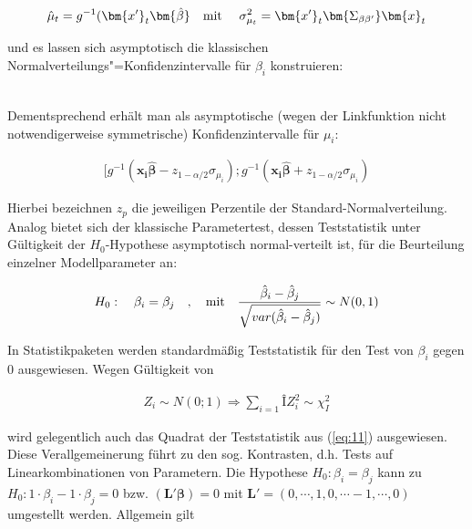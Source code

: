 \begin{eqnarray}  
\hat{\mu}_t=g^{-1}(\bm{x'}_t \bm{\hat{\beta}}   \quad \textnormal{mit } \quad   \sigma_{\mu_t}^2 = \bm{x'}_t  \bm{\Sigma_{\beta\beta'}}  \bm{x}_t
\end{eqnarray}

und es lassen sich asymptotisch die klassischen Normalverteilungs"=Konfidenzintervalle für $\beta_i$  konstruieren:  

\begin{eqnarray}
[ \hat{\beta_i} - z_{1-\alpha/2} \sqrt{Var(\hat{\beta_i}}  ;  \hat{\beta_i} + z_{1-\alpha/2} \sqrt{Var(\hat{\beta_i}} ]
\end{eqnarray}
 
Dementsprechend erhält man als asymptotische (wegen der Linkfunktion nicht notwendigerweise symmetrische) Konfidenzintervalle für  $\mu_i$: 

\begin{eqnarray}
[g^{-1}(\bm{x_i \hat{\beta}}-z_{1-\alpha/2}\sigma_{\mu_i})  ;  g^{-1}(\bm{x_i \hat{\beta}}+z_{1-\alpha/2}\sigma_{\mu_i})
\end{eqnarray}

Hierbei bezeichnen $z_p$  die jeweiligen Perzentile der Standard-Normalverteilung. Analog bietet sich der klassische Parametertest, dessen Teststatistik unter Gültigkeit der  $H_0$-Hypothese asymptotisch normal-verteilt ist, für die Beurteilung einzelner Modellparameter an:

\begin{eqnarray} \label{eq:11} 
H_0: \quad \beta_i=\beta_j \quad , \quad \textnormal{mit} \quad \frac{\hat{\beta}_i - \hat{\beta}_j}{\sqrt{var(\hat{\beta}_i - \hat{\beta}_j)}}  \sim N(0,1)
\end{eqnarray}

In Statistikpaketen werden standardmäßig Teststatistik für den Test von $\beta_i$  gegen 0 ausgewiesen. Wegen Gültigkeit von 

\begin{eqnarray} 
Z_i \sim N(0;1) \Longrightarrow \sum_{i=1}Î Z_i^2 \sim \chi_I^2
\end{eqnarray}
  
wird gelegentlich auch das Quadrat der Teststatistik aus (\ref{eq:11}) ausgewiesen. Diese Verallgemeinerung führt zu den sog. Kontrasten, d.h. Tests auf Linearkombinationen von Parametern. Die Hypothese $H_0: \beta_i=\beta_j$  kann zu $H_0: 1\cdot\beta_i - 1\cdot\beta_j=0$  bzw.  $ (\bm{L'\beta})=0$ mit $\bm{L'} = (0,\cdots,1,0,\cdots-1,\cdots,0)$  umgestellt werden. Allgemein gilt 

